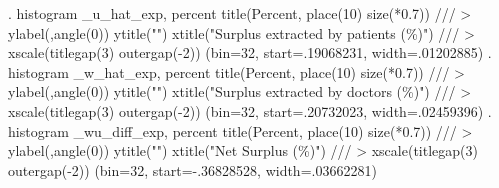 . histogram _u_hat_exp, percent title(Percent, place(10) size(*0.7))                 ///
>         ylabel(,angle(0)) ytitle("") xtitle("Surplus extracted by patients (\%)")  ///
>         xscale(titlegap(3) outergap(-2))
(bin=32, start=.19068231, width=.01202885)
{\smallskip}
. histogram _w_hat_exp, percent title(Percent, place(10) size(*0.7))                 ///
>         ylabel(,angle(0)) ytitle("") xtitle("Surplus extracted by doctors (\%)")   ///
>         xscale(titlegap(3) outergap(-2))
(bin=32, start=.20732023, width=.02459396)
{\smallskip}
. histogram _wu_diff_exp, percent title(Percent, place(10) size(*0.7))               ///
>         ylabel(,angle(0)) ytitle("") xtitle("Net Surplus (\%)")                    ///
>         xscale(titlegap(3) outergap(-2))
(bin=32, start=-.36828528, width=.03662281)
